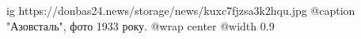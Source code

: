  
 
 
 
 

\ifcmt
  ig https://donbas24.news/storage/news/kuxc7fjzsa3k2hqu.jpg
	@caption "Азовсталь", фото 1933 року.
  @wrap center
  @width 0.9
\fi
